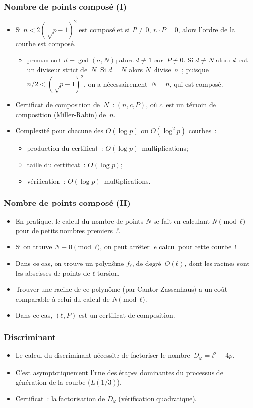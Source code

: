\documentclass[francais]{beamer}
\begin{document}
\begin{frame}\frametitle{Nombre de points composé (I)}
\begin{itemize}
\item Si $n < 2 (√p-1)^2$ est composé et si $P ≠ 0$, $n · P = 0$,
alors l'ordre de la courbe est composé.
\begin{itemize}
\item preuve: soit $d = \gcd (n, N)$; alors $d ≠ 1$ car~$P ≠ 0$.
Si $d ≠ N$ alors $d$~est un diviseur strict de~$N$.
Si $d = N$ alors $N$~divise~$n$ ; puisque $n/2 < (√p-1)^2$,
on a nécessairement~$N = n$, qui est composé.
\end{itemize}
\item Certificat de composition de~$N$ : $(n, c, P)$,
où $c$~est un témoin de composition (Miller-Rabin) de~$n$.
\item Complexité pour chacune des $O(\log p)$ ou $O(\log^2 p)$ courbes :
\begin{itemize}
\item production du certificat : $O(\log p)$~multiplications;
\item taille du certificat : $O(\log p)$;
\item vérification : $O(\log p)$~multiplications.
\end{itemize}
\end{itemize}
\end{frame}

\begin{frame}\frametitle{Nombre de points composé (II)}
\begin{itemize}
\item En pratique, le calcul du nombre de points $N$
se fait en calculant $N \pmod{ℓ}$ pour de petits nombres premiers~$ℓ$.
\item Si on trouve $N ≡ 0 \pmod{ℓ}$, on peut arrêter le calcul
pour cette courbe !
\bigskip
\item Dans ce cas, on trouve un polynôme $f_{ℓ}$, de degré~$O(ℓ)$,
dont les racines sont les abscisses de points de $ℓ$-torsion.
\item Trouver une racine de ce polynôme (par Cantor-Zassenhaus)
a un coût comparable à celui du calcul de $N \pmod{ℓ}$.
\item Dans ce cas, $(ℓ, P)$ est un certificat de composition.
\end{itemize}
\end{frame}

\begin{frame}\frametitle{Discriminant}
\begin{itemize}
\item Le calcul du discriminant nécessite de factoriser
le nombre~$D_{φ} = t^2 - 4p$.
\item C'est asymptotiquement l'une des étapes dominantes
du processus de génération de la courbe ($L(1/3)$).
\item Certificat : la factorisation de $D_{φ}$ (vérification quadratique).
\end{itemize}
\end{frame}
\end{document}
